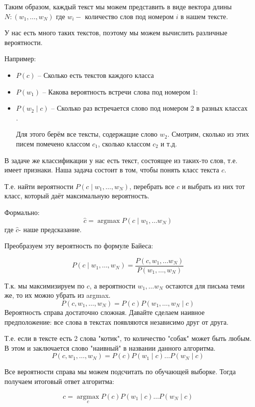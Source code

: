 Таким образом, каждый текст мы можем представить в виде вектора длины $N:\left(w_{1}, \ldots, w_{N}\right)$ где $w_{i}-$ количество слов под номером $i$ в нашем тексте.

У нас есть много таких текстов, поэтому мы можем вычислить различные вероятности. 

Например:

\begin{itemize}
    \item $P(c)$ -- Сколько есть текстов каждого класса 
    
    \item $P\left(w_{1}\right)$  -- Какова вероятность встречи слова под номером 1: 
    
    \item $P\left(w_{2} \mid c\right)$ -- Сколько раз встречается слово под номером 2 в разных классах . 
    
    Для этого берём все тексты, содержащие слово $w_{2} .$ Смотрим, сколько из этих писем помечено классом $c_{1}$,
    сколько классом $c_{2}$ и т.д. 
\end{itemize}



В задаче же классификации у нас есть текст, состоящее из таких-то слов, т.е. имеет признаки. Наша задача состоит в том, чтобы понять класс текста $c$. 

Т.е. найти вероятности $P\left(c \mid w_{1}, \ldots, w_{N}\right)$,
перебрать все $c$ и выбрать из них тот класс, который даёт максимальную вероятность.

Формально:
$$\hat{c}=\operatorname{argmax} P\left(c \mid w_{1}, \ldots w_{N}\right)$$
где $\hat{c}$- наше предсказание.

Преобразуем эту вероятность по формуле Байеса:

$$P\left(c \mid w_{1}, \ldots, w_{N}\right)=\frac{P\left(c, w_{1}, \ldots w_{N}\right)}{P\left(w_{1}, \ldots, w_{N}\right)}$$

Т.к. мы максимизируем по $c$, а вероятности $w_{1}, \ldots w_{N}$ остаются
для письма теми же, то их можно убрать из argmax. 
$$P\left(c, w_{1}, \ldots, w_{N}\right)=P(c) P\left(w_{1}, \ldots, w_{N} \mid c\right)$$
Вероятность справа достаточно сложная. Давайте сделаем наивное  предположение: все слова в текстах появляются независимо друг от друга. 

Т.е. если в тексте есть 2 слова "котик", то количество "собак" может быть любым. В этом и заключается слово "наивный" в названии
данного алгоритма.
$$P\left(c, w_{1}, \ldots, w_{N}\right)=P(c) P\left(w_{1} \mid c\right) \ldots P\left(w_{N} \mid c\right)$$

Все вероятности справа мы можем подсчитать по обучающей выборке. Тогда получаем итоговый ответ алгоритма:

$$\hat{c}=\underset{c}{\operatorname{argmax}} P(c) P\left(w_{1} \mid c\right) \ldots P\left(w_{N} \mid c\right)$$
